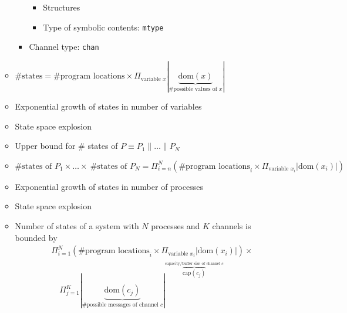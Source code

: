 \begin{itemize}
\begin{itemize}
\begin{itemize}
\begin{itemize}
                            \item Structures
                            \item Type of symbolic contents: \verb+mtype+
                        \end{itemize}
                    \item Channel type: \verb+chan+
                \end{itemize}
        \end{itemize}
        \begin{itemize}
                \begin{itemize}
                    \item $\#\text{states} = \#\text{program locations} \times \Pi_{\text{variable } x} | \underbrace{\text{dom}(x)}_{\#\text{possible values of } x} |$
                    \item Exponential growth of states in number of variables
                    \item State space explosion
                \end{itemize}
                \begin{itemize}
                    \item Upper bound for $\#$ states of $P \equiv P_1 \parallel \dots \parallel P_N$
                    \item $\# \text{states of } P_1 \times \dots \times \ \# \text{states of } P_N = \Pi_{i=n}^N ( \#\text{program locations}_i \times \Pi_{\text{variable } x_i} | \text{dom}(x_i)|)$
                    \item Exponential growth of states in number of processes
                    \item State space explosion
                \end{itemize}
                \begin{itemize}
                    \item Number of states of a system with $N$ processes and $K$ channels is bounded by
                        \begin{align*}
                            &\Pi_{i=1}^N (\# \text{program locations}_i \times \Pi_{\text{variable } x_i} | \text{dom}(x_i) |) \times\\
                            &\quad \Pi_{j=1}^K | \underbrace{\text{dom}(c_j)}_{\#\text{possible messages of channel } c} |^{\overbrace{\text{cap}(c_j)}^{\text{capacity/buffer size of channel }c}}

\end{align*}
\end{itemize}
\end{itemize}
\end{itemize}

